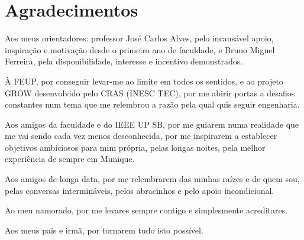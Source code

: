 \chapter*{Agradecimentos}
\noindent
Aos meus orientadores: professor José Carlos Alves, pelo incansável apoio, inspiração e motivação desde o primeiro ano de faculdade, e Bruno Miguel Ferreira, pela disponibilidade, interesse e incentivo demonstrados.

\noindent
À FEUP, por conseguir levar-me ao limite em todos os sentidos, e ao projeto GROW desenvolvido pelo CRAS (INESC TEC), por me abirir portas a desafios constantes num tema que me relembrou a razão pela qual quis seguir engenharia.

\noindent
Aos amigos da faculdade e do IEEE UP SB, por me guiarem numa realidade que me vai sendo cada vez menos desconhecida, por me inspirarem a establecer objetivos ambiciosos para mim própria, pelas longas noites, pela melhor experiência de sempre em Munique.

\noindent
Aos amigos de longa data, por me relembrarem das minhas raízes e de quem sou, pelas conversas intermináveis, pelos abracinhos e pelo apoio incondicional.

\noindent
Ao meu namorado, por me levares sempre contigo e simplesmente acreditares.

\noindent
Aos meus pais e irmã, por tornarem tudo isto possível.

\vspace{10mm}
